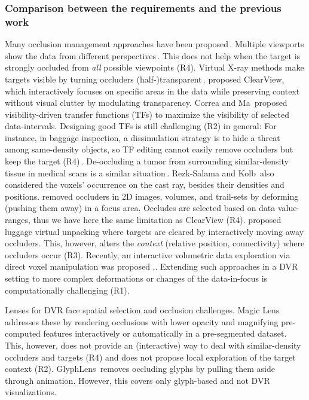 \subsubsection{ Comparison between the requirements and the previous work }

Many occlusion management approaches have been proposed\,\cite{4483791}. Multiple viewports show the data from different perspectives\,\cite{WangBaldonado:2000:GUM:345513.345271}. This does not help when the target is strongly occluded from \emph{all} possible viewpoints (R4). Virtual X-ray methods make targets visible by turning occluders (half-)transparent\,\cite{Burns:2008:ACC:1457515.1409107}.\cite{4015450} proposed ClearView, which interactively focuses on specific areas in the data while preserving context without visual clutter by modulating transparency. Correa and Ma\,\cite{5416704} proposed visibility-driven transfer functions (TFs) to maximize the visibility of selected data-intervals. Designing good TFs is still challenging (R2) in general: For instance, in baggage inspection, a dissimulation strategy is to hide a threat among same-density objects, so TF editing cannot easily remove occluders but keep the target (R4)\,\cite{7819413}. De-occluding a tumor from surrounding similar-density tissue in medical scans is a similar situation\,\cite{CGF:CGF12927}. 
Rezk-Salama and Kolb\,\cite{CGF:CGF979} also considered the voxels' occurrence on the cast ray, besides their densities and positions.\cite{6787171} removed occluders in 2D images, volumes, and trail-sets by deforming (pushing them away) in a focus area. Occludes are selected based on data value-ranges, thus we have here the same limitation as ClearView (R4). \cite{Li:2012:LVV:2425296.2425325} proposed luggage virtual unpacking where targets are cleared by interactively moving away occluders. This, however, alters the \emph{context} (relative position, connectivity) where occluders occur (R3). Recently, an interactive volumetric data exploration via direct voxel manipulation was proposed ,\cite{7819413}. Extending such approaches in a DVR setting to more complex deformations or changes of the data-in-focus is computationally challenging (R1).

Lenses for DVR face spatial selection and occlusion challenges. Magic Lens\,\cite{1532818} addresses these by rendering occlusions with lower opacity and magnifying pre-computed features interactively or automatically in a pre-segmented dataset. This, however, does not provide an (interactive) way to deal with similar-density occluders and targets (R4) and does not propose local exploration of the target context (R2). GlyphLens\,\cite{7539643} removes occluding glyphs by pulling them aside through animation. However, this covers only glyph-based and not DVR visualizations. 


